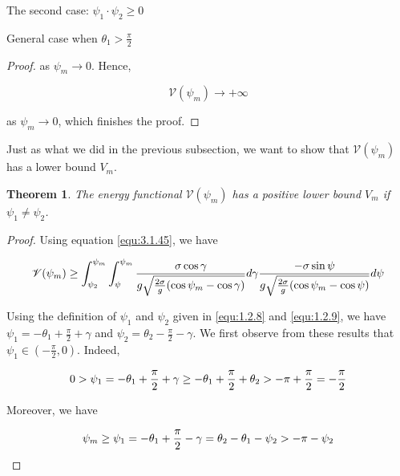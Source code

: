 \documentclass[letterpaper,reqno,10pt,twoside]{amsart}
\newtheorem{theorem}{Theorem}[section]
\theoremstyle{definition}
\theoremstyle{remark}
\begin{document}
\begin{section}{The second case: $\psi_1\cdot \psi_2\geq 0$ }
\begin{subsection}{General case when $\theta_1>\frac{\pi}{2}$}
\begin{proof}
                \noindent as $\psi_m\rightarrow 0$. Hence,

                \begin{equation*}
                \mathscr{V}(\psi_m)\rightarrow +\infty
                \end{equation*}

                \noindent as $\psi_m\rightarrow 0$, which finishes the proof.
            \end{proof}

             Just as what we did in the previous subsection, we want to show that ${\mathscr{V}}(\psi_m)$ has a lower bound $V_m$.

            \begin{theorem}

               The energy functional $\mathscr{V}(\psi_m)$ has a positive lower bound $V_m$ if $\psi_{1}\neq \psi_{2}$.
            \end{theorem}

            \begin{proof}

             Using equation \eqref{equ:3.1.45}, we have

            \begin{equation}{\label{equ:3.1.53}}
                 \mathscr{V}(\psi_m)\geq \int_{\psi_2}^{\psi_m}\int_{\psi}^{\psi_m}\frac{\sigma\cos\gamma}{g\sqrt{\frac{2\sigma}{g}(\cos\psi_m-\cos\gamma)}}d\gamma \frac{-\sigma\sin\psi}{g\sqrt{\frac{2\sigma}{g}(\cos\psi_m-\cos\psi)}}d\psi
            \end{equation}

            Using the definition of $\psi_1$ and $\psi_2$ given in \eqref{equ:1.2.8} and \eqref{equ:1.2.9}, we have $\psi_1=-\theta_1+\frac{\pi}{2}+\gamma$ and $\psi_2=\theta_2-\frac{\pi}{2}-\gamma$.  We first observe from these results that $\psi_1\in(-\frac{\pi}{2},0)$. Indeed,

            \begin{equation}{\label{equ:3.1.50}}
                0>\psi_1=-\theta_1+\frac{\pi}{2}+\gamma\geq -\theta_1+\frac{\pi}{2}+\theta_2>-\pi+\frac{\pi}{2}=-\frac{\pi}{2}
            \end{equation}
            
            \noindent Moreover, we have

            \begin{equation}{\label{equ:3.1.51}}
            \psi_m\geq \psi_1=-\theta_1+\frac{\pi}{2}-\gamma=\theta_2-\theta_1-\psi_2>-\pi-\psi_2
            \end{equation}
            

\end{proof}
\end{subsection}
\end{section}
\end{document}
